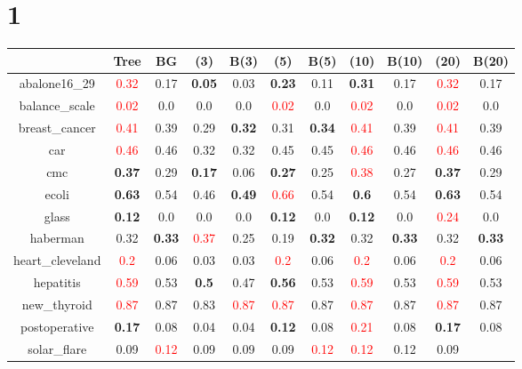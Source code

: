 \documentclass{article}%
\begin{document}
\section*{1}%
\begin{tabular}{c|cccccccccc}%
\hline%
&Tree&BG&(3)&B(3)&(5)&B(5)&(10)&B(10)&(20)&B(20)\\%
\hline%
abalone16\_29&\textcolor{red}{ 
0.32
}&0.17&\textbf{0.05}&0.03&\textbf{0.23}&0.11&\textbf{0.31}&0.17&\textcolor{red}{ 
0.32
}&0.17\\%
\hline%
balance\_scale&\textcolor{red}{ 
0.02
}&0.0&0.0&0.0&\textcolor{red}{ 
0.02
}&0.0&\textcolor{red}{ 
0.02
}&0.0&\textcolor{red}{ 
0.02
}&0.0\\%
\hline%
breast\_cancer&\textcolor{red}{ 
0.41
}&0.39&0.29&\textbf{0.32}&0.31&\textbf{0.34}&\textcolor{red}{ 
0.41
}&0.39&\textcolor{red}{ 
0.41
}&0.39\\%
\hline%
car&\textcolor{red}{ 
0.46
}&0.46&0.32&0.32&0.45&0.45&\textcolor{red}{ 
0.46
}&0.46&\textcolor{red}{ 
0.46
}&0.46\\%
\hline%
cmc&\textbf{0.37}&0.29&\textbf{0.17}&0.06&\textbf{0.27}&0.25&\textcolor{red}{ 
0.38
}&0.27&\textbf{0.37}&0.29\\%
\hline%
ecoli&\textbf{0.63}&0.54&0.46&\textbf{0.49}&\textcolor{red}{ 
0.66
}&0.54&\textbf{0.6}&0.54&\textbf{0.63}&0.54\\%
\hline%
glass&\textbf{0.12}&0.0&0.0&0.0&\textbf{0.12}&0.0&\textbf{0.12}&0.0&\textcolor{red}{ 
0.24
}&0.0\\%
\hline%
haberman&0.32&\textbf{0.33}&\textcolor{red}{ 
0.37
}&0.25&0.19&\textbf{0.32}&0.32&\textbf{0.33}&0.32&\textbf{0.33}\\%
\hline%
heart\_cleveland&\textcolor{red}{ 
0.2
}&0.06&0.03&0.03&\textcolor{red}{ 
0.2
}&0.06&\textcolor{red}{ 
0.2
}&0.06&\textcolor{red}{ 
0.2
}&0.06\\%
\hline%
hepatitis&\textcolor{red}{ 
0.59
}&0.53&\textbf{0.5}&0.47&\textbf{0.56}&0.53&\textcolor{red}{ 
0.59
}&0.53&\textcolor{red}{ 
0.59
}&0.53\\%
\hline%
new\_thyroid&\textcolor{red}{ 
0.87
}&0.87&0.83&\textcolor{red}{ 
0.87
}&\textcolor{red}{ 
0.87
}&0.87&\textcolor{red}{ 
0.87
}&0.87&\textcolor{red}{ 
0.87
}&0.87\\%
\hline%
postoperative&\textbf{0.17}&0.08&0.04&0.04&\textbf{0.12}&0.08&\textcolor{red}{ 
0.21
}&0.08&\textbf{0.17}&0.08\\%
\hline%
solar\_flare&0.09&\textcolor{red}{ 
0.12
}&0.09&0.09&0.09&\textcolor{red}{ 
0.12
}&\textcolor{red}{ 
0.12
}&0.12&0.09&\textcolor{red}{ 
}
\end{tabular}
\end{document}
